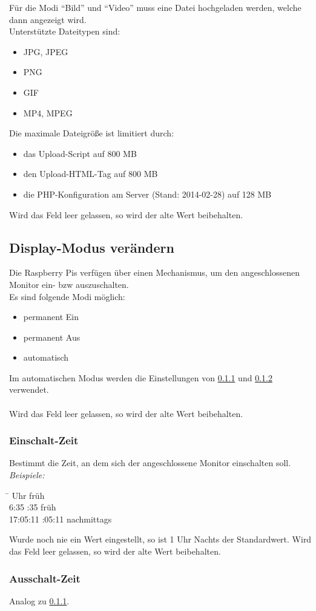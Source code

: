 Für die Modi \enquote{Bild} und \enquote{Video} muss eine Datei hochgeladen werden, welche dann angezeigt wird.\\ 
Unterstützte Dateitypen sind:
\begin{itemize}
	\item JPG, JPEG
	\item PNG
	\item GIF
	\item MP4, MPEG
\end{itemize}
Die maximale Dateigröße ist limitiert durch:
\begin{itemize}
	\item das Upload-Script auf 800 MB
	\item den Upload-HTML-Tag auf 800 MB
	\item die PHP-Konfiguration am Server (Stand: 2014-02-28) auf 128 MB
\end{itemize}
Wird das Feld leer gelassen, so wird der alte Wert beibehalten.\\

\subsection{Display-Modus verändern}

Die Raspberry Pis verfügen über einen Mechanismus, um den angeschlossenen Monitor ein- bzw auszuschalten.\\
Es sind folgende Modi möglich:
\begin{itemize}
	\item permanent Ein
	\item permanent Aus
	\item automatisch
\end{itemize}
Im automatischen Modus werden die Einstellungen von \ref{instr_admin_moni_time_on} und \ref{instr_admin_moni_time_off} verwendet.\\
\\
Wird das Feld leer gelassen, so wird der alte Wert beibehalten.\\

\subsubsection{Einschalt-Zeit}
\label{instr_admin_moni_time_on}

Bestimmt die Zeit, an dem sich der angeschlossene Monitor einschalten soll.\\
\textit{Beispiele:}
\begin{tabbing}
\hspace{2cm}\=  Uhr früh\\ 
6:35 :35 früh\\
17:05:11 :05:11 nachmittags
\end{tabbing}
Wurde noch nie ein Wert eingestellt, so ist 1 Uhr Nachts der Standardwert. Wird das Feld leer gelassen, so wird der alte Wert beibehalten.\\

\subsubsection{Ausschalt-Zeit}
\label{instr_admin_moni_time_off}

Analog zu \ref{instr_admin_moni_time_on}.
